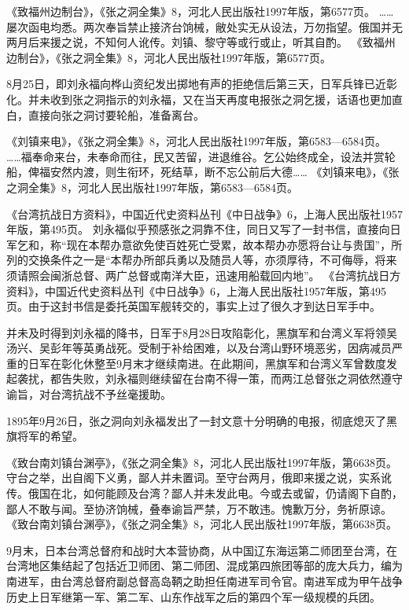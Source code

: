 \documentclass[12pt,UTF8]{ctexbook}
\begin{document}
《致福州边制台》，《张之洞全集》8，河北人民出版社1997年版，第6577页。
……屡次函电均悉。两次奉旨禁止接济台饷械，敝处实无从设法，万勿指望。俄国并无两月后来援之说，不知何人讹传。刘镇、黎守等或行或止，听其自酌。 《致福州边制台》，《张之洞全集》8，河北人民出版社1997年版，第6577页。

8月25日，即刘永福向桦山资纪发出掷地有声的拒绝信后第三天，日军兵锋已近彰化。并未收到张之洞指示的刘永福，又在当天再度电报张之洞乞援，话语也更加直白，直接向张之洞讨要轮船，准备离台。

《刘镇来电》，《张之洞全集》8，河北人民出版社1997年版，第6583—6584页。
……福奉命来台，未奉命而往，民又苦留，进退维谷。乞公始终成全，设法并赏轮船，俾福安然内渡，则生衔环，死结草，断不忘公前后大德…… 《刘镇来电》，《张之洞全集》8，河北人民出版社1997年版，第6583—6584页。

《台湾抗战日方资料》，中国近代史资料丛刊《中日战争》6，上海人民出版社1957年版，第495页。
刘永福似乎预感张之洞靠不住，同日又写了一封书信，直接向日军乞和，称“现在本帮办意欲免使百姓死亡受累，故本帮办亦愿将台让与贵国”，所列的交换条件之一是“本帮办所部兵勇以及随员人等，亦须厚待，不可侮辱，将来须请照会闽浙总督、两广总督或南洋大臣，迅速用船载回内地”。 《台湾抗战日方资料》，中国近代史资料丛刊《中日战争》6，上海人民出版社1957年版，第495页。由于这封书信是委托英国军舰转交的，事实上过了很久才到达日军手中。

并未及时得到刘永福的降书，日军于8月28日攻陷彰化，黑旗军和台湾义军将领吴汤兴、吴彭年等英勇战死。受制于补给困难，以及台湾山野环境恶劣，因病减员严重的日军在彰化休整至9月末才继续南进。在此期间，黑旗军和台湾义军曾数度发起袭扰，都告失败，刘永福则继续留在台南不得一策，而两江总督张之洞依然遵守谕旨，对台湾抗战不予丝毫援助。

1895年9月26日，张之洞向刘永福发出了一封文意十分明确的电报，彻底熄灭了黑旗将军的希望。

《致台南刘镇台渊亭》，《张之洞全集》8，河北人民出版社1997年版，第6638页。
守台之举，出自阁下义勇，鄙人并未置词。至守台两月，俄即来援之说，实系讹传。俄国在北，如何能顾及台湾？鄙人并未发此电。今或去或留，仍请阁下自酌，鄙人不敢与闻。至协济饷械，叠奉谕旨严禁，万不敢违。愧歉万分，务祈原谅。 《致台南刘镇台渊亭》，《张之洞全集》8，河北人民出版社1997年版，第6638页。

9月末，日本台湾总督府和战时大本营协商，从中国辽东海运第二师团至台湾，在台湾地区集结起了包括近卫师团、第二师团、混成第四旅团等部的庞大兵力，编为南进军，由台湾总督府副总督高岛鞆之助担任南进军司令官。南进军成为甲午战争历史上日军继第一军、第二军、山东作战军之后的第四个军一级规模的兵团。
\end{document}
